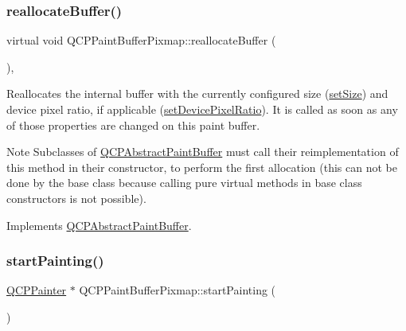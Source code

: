 \subsubsection{\texorpdfstring{reallocate\+Buffer()}{reallocateBuffer()}\hspace{0.1cm}{\footnotesize\ttfamily [2/2]}}
{\footnotesize\ttfamily virtual void Q\+C\+P\+Paint\+Buffer\+Pixmap\+::reallocate\+Buffer (\begin{DoxyParamCaption}{ }\end{DoxyParamCaption})\hspace{0.3cm}{\ttfamily [protected]}, {\ttfamily [virtual]}}

Reallocates the internal buffer with the currently configured size (\hyperlink{class_q_c_p_abstract_paint_buffer_a8b68c3cd36533f1a4a23b5ce8cd66f01}{set\+Size}) and device pixel ratio, if applicable (\hyperlink{class_q_c_p_abstract_paint_buffer_a555eaad5d5c806420ff35602a1bb68fa}{set\+Device\+Pixel\+Ratio}). It is called as soon as any of those properties are changed on this paint buffer.

\begin{DoxyNote}{Note}
Subclasses of \hyperlink{class_q_c_p_abstract_paint_buffer}{Q\+C\+P\+Abstract\+Paint\+Buffer} must call their reimplementation of this method in their constructor, to perform the first allocation (this can not be done by the base class because calling pure virtual methods in base class constructors is not possible). 
\end{DoxyNote}


Implements \hyperlink{class_q_c_p_abstract_paint_buffer_aee7506a52bd7e5a07c2af27935eb13e7}{Q\+C\+P\+Abstract\+Paint\+Buffer}.

\mbox{\label{class_q_c_p_paint_buffer_pixmap_a357964ef7d28cfa530338be4e5c93234}} 
\subsubsection{\texorpdfstring{start\+Painting()}{startPainting()}\hspace{0.1cm}{\footnotesize\ttfamily [1/2]}}
{\footnotesize\ttfamily \hyperlink{class_q_c_p_painter}{Q\+C\+P\+Painter} $\ast$ Q\+C\+P\+Paint\+Buffer\+Pixmap\+::start\+Painting (\begin{DoxyParamCaption}{ }\end{DoxyParamCaption})\hspace{0.3cm}{\ttfamily [virtual]}}

